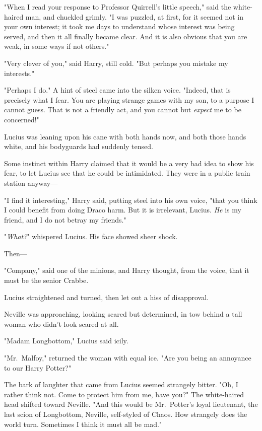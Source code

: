 "When I read your response to Professor Quirrell's little speech," said the 
white-haired man, and chuckled grimly. "I was puzzled, at first, for it seemed 
not in your own interest; it took me days to understand whose interest was 
being served, and then it all finally became clear. And it is also obvious that 
you are weak, in some ways if not others."

"Very clever of you," said Harry, still cold. "But perhaps you mistake my 
interests."

"Perhaps I do." A hint of steel came into the silken voice. "Indeed, that is 
precisely what I fear. You are playing strange games with my son, to a purpose 
I cannot guess. That is not a friendly act, and you cannot but \emph{expect} me 
to be concerned!"

Lucius was leaning upon his cane with both hands now, and both those hands 
white, and his bodyguards had suddenly tensed.

Some instinct within Harry claimed that it would be a very bad idea to show his 
fear, to let Lucius see that he could be intimidated. They were in a public 
train station anyway---

"I find it interesting," Harry said, putting steel into his own voice, "that 
you think I could benefit from doing Draco harm. But it is irrelevant, Lucius. 
\emph{He} is my friend, and I do not betray my friends."

"\emph{What?}" whispered Lucius. His face showed sheer shock.

Then---

"Company," said one of the minions, and Harry thought, from the voice, that it 
must be the senior Crabbe.

Lucius straightened and turned, then let out a hiss of disapproval.

Neville was approaching, looking scared but determined, in tow behind a tall 
woman who didn't look scared at all.

"Madam Longbottom," Lucius said icily.

"Mr.~Malfoy," returned the woman with equal ice. "Are you being an annoyance to 
our Harry Potter?"

The bark of laughter that came from Lucius seemed strangely bitter. "Oh, I 
rather think not. Come to protect him from me, have you?" The white-haired head 
shifted toward Neville. "And this would be Mr.~Potter's loyal lieutenant, the 
last scion of Longbottom, Neville, self-styled of Chaos. How strangely does the 
world turn. Sometimes I think it must all be mad."

